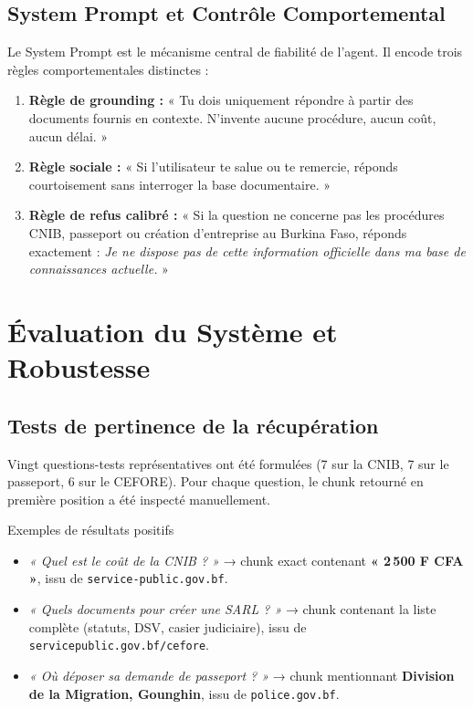 \documentclass[12pt, a4paper]{article}
\begin{document}
\subsection{System Prompt et Contrôle Comportemental}

Le System Prompt est le mécanisme central de fiabilité de l'agent. Il encode trois règles comportementales distinctes :

\begin{enumerate}
  \item \textbf{Règle de grounding :} « Tu dois uniquement répondre à partir des documents fournis en contexte. N'invente aucune procédure, aucun coût, aucun délai. »
  \item \textbf{Règle sociale :} « Si l'utilisateur te salue ou te remercie, réponds courtoisement sans interroger la base documentaire. »
  \item \textbf{Règle de refus calibré :} « Si la question ne concerne pas les procédures CNIB, passeport ou création d'entreprise au Burkina Faso, réponds exactement : \emph{Je ne dispose pas de cette information officielle dans ma base de connaissances actuelle.} »
\end{enumerate}


\section{Évaluation du Système et Robustesse}

\subsection{Tests de pertinence de la récupération}

Vingt questions-tests représentatives ont été formulées (7 sur la CNIB, 7 sur le passeport, 6 sur le CEFORE). Pour chaque question, le chunk retourné en première position a été inspecté manuellement.

\begin{infobox}{Exemples de résultats positifs}
\begin{itemize}[noitemsep]
  \item \emph{« Quel est le coût de la CNIB ? »} → chunk exact contenant \textbf{« 2\,500 F CFA »}, issu de \texttt{service-public.gov.bf}.
  \item \emph{« Quels documents pour créer une SARL ? »} → chunk contenant la liste complète (statuts, DSV, casier judiciaire), issu de \texttt{servicepublic.gov.bf/cefore}.
  \item \emph{« Où déposer sa demande de passeport ? »} → chunk mentionnant \textbf{Division de la Migration, Gounghin}, issu de \texttt{police.gov.bf}.
\end{itemize}
\end{infobox}
\end{document}
